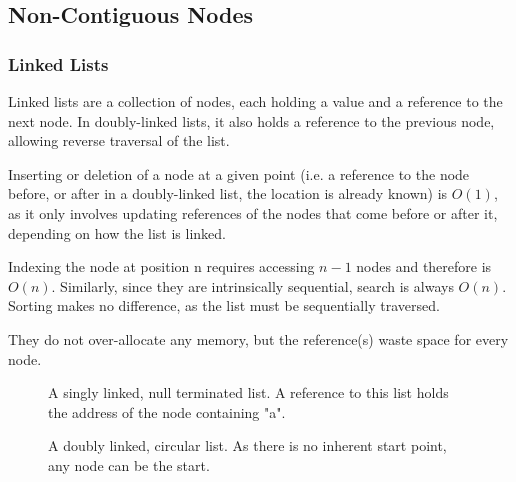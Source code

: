 \documentclass[]{article}
\begin{document}
\pagebreak

\subsection{Non-Contiguous Nodes}

\subsubsection{Linked Lists}

Linked lists are a collection of nodes, each holding a value and a reference to the next node. In doubly-linked lists, it also holds a reference to the previous node, allowing reverse traversal of the list.

Inserting or deletion of a node at a given point (i.e. a reference to the node before, or after in a doubly-linked list, the location is already known) is $O(1)$, as it only involves updating references of the nodes that come before or after it, depending on how the list is linked.

Indexing the node at position n requires accessing $n-1$ nodes and therefore is $O(n)$. Similarly, since they are intrinsically sequential, search is always $O(n)$. Sorting makes no difference, as the list must be sequentially traversed.

They do not over-allocate any memory, but the reference(s) waste space for every node.

\begin{figure}[ph]
\centering
{}
\caption{A singly linked, null terminated list. A reference to this list holds the address of the node containing "a".}
\end{figure}

\begin{figure}[ph]
\centering
{}
\caption{A doubly linked, circular list. As there is no inherent start point, any node can be the start.}
\end{figure}
\end{document}
